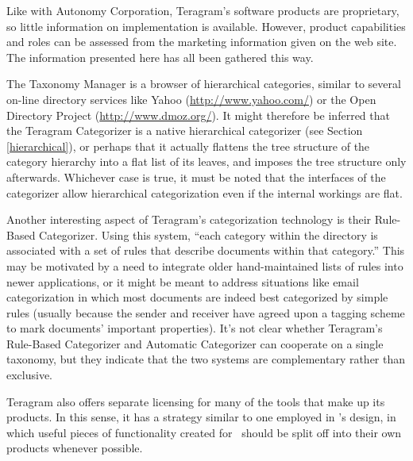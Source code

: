 Like with Autonomy Corporation, Teragram's software products are proprietary, so little
information on implementation is available.  However, product
capabilities and roles can be assessed from the marketing information
given on the web site.  The information presented here has all been
gathered this way.

The Taxonomy Manager is a browser of hierarchical categories, similar
to several on-line directory services like Yahoo
(\url{http://www.yahoo.com/}) or the Open Directory Project
(\url{http://www.dmoz.org/}).  It might therefore be inferred that the
Teragram Categorizer is a native hierarchical categorizer (see Section
\ref{hierarchical}), or perhaps that it
actually flattens the tree structure of the category
hierarchy into a flat list of its leaves, and imposes the tree
structure only afterwards.  Whichever case is true, it must be noted
that the interfaces of the categorizer allow hierarchical
categorization even if the internal workings are flat.

Another interesting aspect of Teragram's categorization technology is
their Rule-Based Categorizer.  Using this system, ``each category
within the directory is associated with a set of rules that describe
documents within that category.''  This may be motivated by a need to
integrate older hand-maintained lists of rules into newer
applications, or it might be meant to address situations like email
categorization in which most documents are indeed best categorized by
simple rules (usually because the sender and receiver have agreed upon
a tagging scheme to mark documents' important properties).  It's not
clear whether Teragram's Rule-Based Categorizer and Automatic
Categorizer can cooperate on a single taxonomy, but they indicate that
the two systems are complementary rather than exclusive.

Teragram also offers separate licensing for many of the tools that
make up its products.  In this sense, it has a strategy similar to one
employed in \aicat's design, in which useful pieces of
functionality created for \aicat\ should be split off into
their own products whenever possible.


